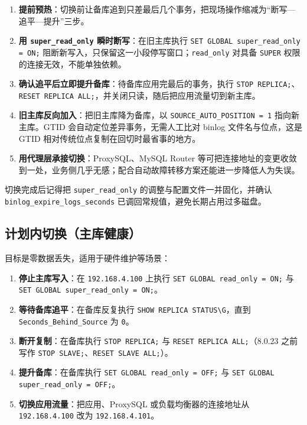 \documentclass[12pt,UTF8]{ctexbook}
\begin{document}
\begin{enumerate}[leftmargin=2cm]
  \item \textbf{提前预热}：切换前让备库追到只差最后几个事务，把现场操作缩减为“断写—追平—提升”三步。
  \item \textbf{用 \texttt{super\_read\_only} 瞬时断写}：在旧主库执行 \texttt{SET GLOBAL super\_read\_only = ON;} 阻断新写入，只保留这一小段停写窗口；\texttt{read\_only} 对具备 \texttt{SUPER} 权限的连接无效，不能单独依赖。
  \item \textbf{确认追平后立即提升备库}：待备库应用完最后的事务，执行 \texttt{STOP REPLICA;}、\texttt{RESET REPLICA ALL;}，并关闭只读，随后把应用流量切到新主库。
  \item \textbf{旧主库反向加入}：把旧主库降为备库，以 \texttt{SOURCE\_AUTO\_POSITION = 1} 指向新主库。GTID 会自动定位差异事务，无需人工比对 binlog 文件名与位点，这是 GTID 相对传统位点复制在回切时最省事的地方。
  \item \textbf{用代理层承接切换}：ProxySQL、MySQL Router 等可把连接地址的变更收敛到一处，业务侧几乎无感；配合自动故障转移方案还能进一步降低人为失误。
\end{enumerate}

切换完成后记得把 \texttt{super\_read\_only} 的调整与配置文件一并固化，并确认 \texttt{binlog\_expire\_logs\_seconds} 已调回常规值，避免长期占用过多磁盘。

\subsection{计划内切换（主库健康）}

目标是零数据丢失，适用于硬件维护等场景：

\begin{enumerate}[leftmargin=2cm]
  \item \textbf{停止主库写入}：在 \texttt{192.168.4.100} 上执行 \texttt{SET GLOBAL read\_only = ON;} 与 \texttt{SET GLOBAL super\_read\_only = ON;}。
  \item \textbf{等待备库追平}：在备库反复执行 \verb|SHOW REPLICA STATUS\G|，直到 \texttt{Seconds\_Behind\_Source} 为 \texttt{0}。
  \item \textbf{断开复制}：在备库执行 \texttt{STOP REPLICA;} 与 \texttt{RESET REPLICA ALL;}（8.0.23 之前写作 \texttt{STOP SLAVE;}、\texttt{RESET SLAVE ALL;}）。
  \item \textbf{提升备库}：在备库执行 \texttt{SET GLOBAL read\_only = OFF;} 与 \texttt{SET GLOBAL super\_read\_only = OFF;}。
  \item \textbf{切换应用流量}：把应用、ProxySQL 或负载均衡器的连接地址从 \texttt{192.168.4.100} 改为 \texttt{192.168.4.101}。
\end{enumerate}
\end{document}
